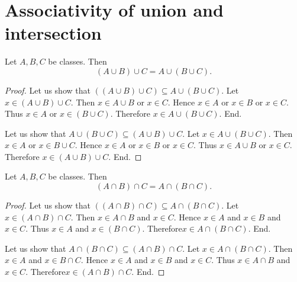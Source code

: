 \documentclass[../set-theory.tex]{subfiles}
\begin{document}
  \section*{Associativity of union and intersection}

  \begin{forthel}
    \begin{proposition}\label{SET_THEORY_02_3854032263184384}
      Let $A, B, C$ be classes.
      Then \[ (A \cup B) \cup C = A \cup (B \cup C). \]
    \end{proposition}
    \begin{proof}
      Let us show that $((A \cup B) \cup C) \subseteq A \cup (B \cup C)$. %
        Let $x \in (A \cup B) \cup C$.
        Then $x \in A \cup B$ or $x \in C$.
        Hence $x \in A$ or $x \in B$ or $x \in C$.
        Thus $x \in A$ or $x \in (B \cup C)$.
        Therefore $x \in A \cup (B \cup C)$.
      End.

      Let us show that $A \cup (B \cup C) \subseteq (A \cup B) \cup C$.
        Let $x \in A \cup (B \cup C)$.
        Then $x \in A$ or $x \in B \cup C$.
        Hence $x \in A$ or $x \in B$ or $x \in C$.
        Thus $x \in A \cup B$ or $x \in C$.
        Therefore $x \in (A \cup B) \cup C$.
      End.
    \end{proof}
  \end{forthel}

  \begin{forthel}
    \begin{proposition}\label{SET_THEORY_02_906751977193472}
      Let $A, B, C$ be classes.
      Then \[ (A \cap B) \cap C = A \cap (B \cap C). \]
    \end{proposition}
    \begin{proof}
      Let us show that $((A \cap B) \cap C) \subseteq A \cap (B \cap C)$. %
        Let $x \in (A \cap B) \cap C$.
        Then $x \in A \cap B$ and $x \in C$.
        Hence $x \in A$ and $x \in B$ and $x \in C$.
        Thus $x \in A$ and $x \in (B \cap C)$.
        Therefore$ x \in A \cap (B \cap C)$.
      End.

      Let us show that $A \cap (B \cap C) \subseteq (A \cap B) \cap C$.
        Let $x \in A \cap (B \cap C)$.
        Then $x \in A$ and $x \in B \cap C$.
        Hence $x \in A$ and $x \in B$ and $x \in C$.
        Thus $x \in A \cap B$ and $x \in C$.
        Therefore$ x \in (A \cap B) \cap C$.
      End.
    \end{proof}
  \end{forthel}
\end{document}
